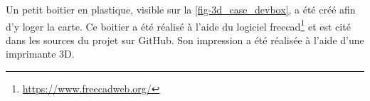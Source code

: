 Un petit boitier en plastique, visible sur la \cref{fig-3d_case_devbox}, a été créé afin d'y loger la carte. Ce boitier a été réalisé à l'aide du logiciel freecad\footnote{\url{https://www.freecadweb.org/}} et est cité dans les sources du projet sur GitHub. Son impression a été réalisée à l'aide d'une imprimante 3D.



\FloatBarrier

